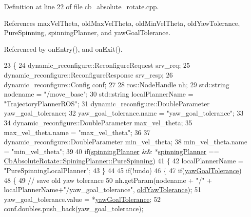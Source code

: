 Definition at line 22 of file cb\+\_\+absolute\+\_\+rotate.\+cpp.



References max\+Vel\+Theta, old\+Max\+Vel\+Theta, old\+Min\+Vel\+Theta, old\+Yaw\+Tolerance, Pure\+Spinning, spinning\+Planner, and yaw\+Goal\+Tolerance.



Referenced by on\+Entry(), and on\+Exit().


\begin{DoxyCode}
23 \{
24     dynamic\_reconfigure::ReconfigureRequest srv\_req;
25     dynamic\_reconfigure::ReconfigureResponse srv\_resp;
26     dynamic\_reconfigure::Config conf;
27 
28     ros::NodeHandle nh;
29     std::string nodename = \textcolor{stringliteral}{"/move\_base"};
30     std::string localPlannerName = \textcolor{stringliteral}{"TrajectoryPlannerROS"};
31     dynamic\_reconfigure::DoubleParameter yaw\_goal\_tolerance;
32     yaw\_goal\_tolerance.name = \textcolor{stringliteral}{"yaw\_goal\_tolerance"};
33 
34     dynamic\_reconfigure::DoubleParameter max\_vel\_theta;
35     max\_vel\_theta.name = \textcolor{stringliteral}{"max\_vel\_theta"};
36 
37     dynamic\_reconfigure::DoubleParameter min\_vel\_theta;
38     min\_vel\_theta.name = \textcolor{stringliteral}{"min\_vel\_theta"};
39 
40     \textcolor{keywordflow}{if}(\hyperlink{classcl__move__base__z_1_1CbAbsoluteRotate_a17d836524599af072cf2e3488e491a91}{spinningPlanner} && *\hyperlink{classcl__move__base__z_1_1CbAbsoluteRotate_a17d836524599af072cf2e3488e491a91}{spinningPlanner} == 
      \hyperlink{classcl__move__base__z_1_1CbAbsoluteRotate_ab8d45e43594a3fc6a71c08f07b5dbef0aada5274435681a4ce04175bebfa6652f}{CbAbsoluteRotate::SpiningPlanner::PureSpinning})
41     \{
42         localPlannerName = \textcolor{stringliteral}{"PureSpinningLocalPlanner"};
43     \}
44     
45     \textcolor{keywordflow}{if}(!undo)
46     \{
47        \textcolor{keywordflow}{if}(\hyperlink{classcl__move__base__z_1_1CbAbsoluteRotate_a8d8b5b9c2c821efe101bb07c96c4bdd3}{yawGoalTolerance})
48        \{
49             \textcolor{comment}{// save old yaw tolerance}
50             nh.getParam(nodename + \textcolor{stringliteral}{"/"}  + localPlannerName+\textcolor{stringliteral}{"/yaw\_goal\_tolerance"}, 
      \hyperlink{classcl__move__base__z_1_1CbAbsoluteRotate_a2cfcd2978e7923494e2e66107e134e27}{oldYawTolerance});
51             yaw\_goal\_tolerance.value = *\hyperlink{classcl__move__base__z_1_1CbAbsoluteRotate_a8d8b5b9c2c821efe101bb07c96c4bdd3}{yawGoalTolerance};
52             conf.doubles.push\_back(yaw\_goal\_tolerance);

\end{DoxyCode}
